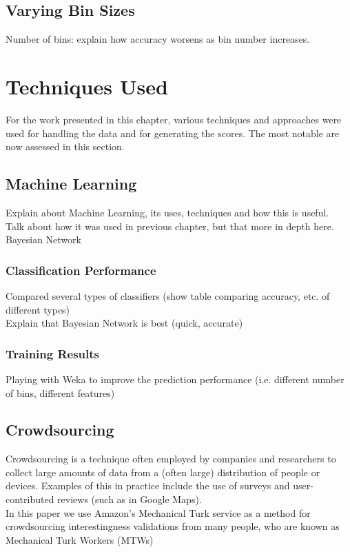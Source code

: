 \subsection{Varying Bin Sizes}
Number of bins: explain how accuracy worsens as bin number increases.
\\


\section{Techniques Used}
For the work presented in this chapter, various techniques and approaches were used for handling the data and for generating the scores. The most notable are now assessed in this section.

\subsection{Machine Learning}
Explain about Machine Learning, its uses, techniques and how this is useful.
\\
Talk about how it was used in previous chapter, but that more in depth here.
Bayesian Network

\subsubsection{Classification Performance}
Compared several types of classifiers (show table comparing accuracy, etc. of different types)
\\
Explain that Bayesian Network is best (quick, accurate)

\subsubsection{Training Results}
Playing with Weka to improve the prediction performance (i.e. different number of bins, different features)

\subsection{Crowdsourcing}
Crowdsourcing is a technique often employed by companies and researchers to collect large amounts of data from a (often large) distribution of people or devices. Examples of this in practice include the use of surveys and user-contributed reviews (such as in Google Maps).\\
In this paper we use Amazon's Mechanical Turk service as a method for crowdsourcing interestingness validations from many people, who are known as Mechanical Turk Workers (MTWs) 


